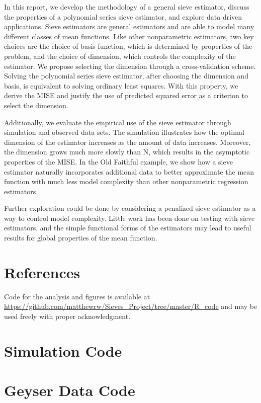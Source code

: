 \documentclass[12pt]{article}  %
\begin{document}
In this report, we develop the methodology of a general sieve estimator, discuss the properties of a polynomial series sieve estimator, and explore data driven applications. Sieve estimators are general estimators and are able to model many different classes of mean functions. Like other nonparametric estimators, two key  choices are the choice of basis function, which is determined by properties of the problem, and the choice of dimension, which controls the complexity of the estimator.  We propose selecting the dimension through a cross-validation scheme. Solving the polynomial series sieve estimator, after choosing the dimension and basis, is equivalent to solving ordinary least squares. With this property, we derive the MISE and justify the use of predicted squared error as a criterion to select the dimension. 

Additionally, we evaluate the empirical use of the sieve estimator through simulation and observed data sets. The simulation illustrates how the optimal dimension of the estimator increases as the amount of data increases. Moreover, the dimension grows much more slowly than N, which results in the asymptotic properties of the  MISE.  In the Old Faithful example, we show how a sieve estimator naturally incorporates additional data to better approximate the mean function with much less model complexity than other nonparametric regression estimators. 

Further exploration could be done by considering a penalized sieve estimator as a way to control model complexity. Little work has been done on testing with sieve estimators, and the simple functional forms of the estimators may lead to useful results for global properties of the mean function. 


\section{References}

Code for the analysis and figures is available at \url{https://github.com/matthewrw/Sieves_Project/tree/master/R_code} and may be used freely with proper acknowledgment.


\nocite{*}
\printbibliography[heading=none]

\newpage
\appendix
\section{Simulation Code}

\section{Geyser Data Code}

\end{document}
